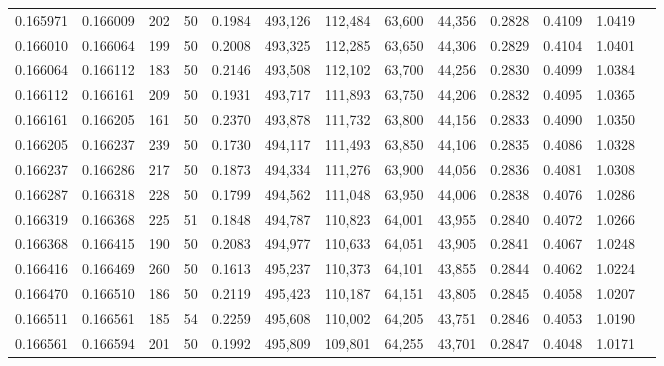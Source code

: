\begin{tabular}{rrrrrrrrrrrrr}
0.165971 & 0.166009 &   202 &  50 &                                     0.1984 & 493,126 & 112,484 &  63,600 &  44,356 & 0.2828 & 0.4109 & 1.0419 \\
0.166010 & 0.166064 &   199 &  50 &                                     0.2008 & 493,325 & 112,285 &  63,650 &  44,306 & 0.2829 & 0.4104 & 1.0401 \\
0.166064 & 0.166112 &   183 &  50 &                                     0.2146 & 493,508 & 112,102 &  63,700 &  44,256 & 0.2830 & 0.4099 & 1.0384 \\
0.166112 & 0.166161 &   209 &  50 &                                     0.1931 & 493,717 & 111,893 &  63,750 &  44,206 & 0.2832 & 0.4095 & 1.0365 \\
0.166161 & 0.166205 &   161 &  50 &                                     0.2370 & 493,878 & 111,732 &  63,800 &  44,156 & 0.2833 & 0.4090 & 1.0350 \\
0.166205 & 0.166237 &   239 &  50 &                                     0.1730 & 494,117 & 111,493 &  63,850 &  44,106 & 0.2835 & 0.4086 & 1.0328 \\
0.166237 & 0.166286 &   217 &  50 &                                     0.1873 & 494,334 & 111,276 &  63,900 &  44,056 & 0.2836 & 0.4081 & 1.0308 \\
0.166287 & 0.166318 &   228 &  50 &                                     0.1799 & 494,562 & 111,048 &  63,950 &  44,006 & 0.2838 & 0.4076 & 1.0286 \\
0.166319 & 0.166368 &   225 &  51 &                                     0.1848 & 494,787 & 110,823 &  64,001 &  43,955 & 0.2840 & 0.4072 & 1.0266 \\
0.166368 & 0.166415 &   190 &  50 &                                     0.2083 & 494,977 & 110,633 &  64,051 &  43,905 & 0.2841 & 0.4067 & 1.0248 \\
0.166416 & 0.166469 &   260 &  50 &                                     0.1613 & 495,237 & 110,373 &  64,101 &  43,855 & 0.2844 & 0.4062 & 1.0224 \\
0.166470 & 0.166510 &   186 &  50 &                                     0.2119 & 495,423 & 110,187 &  64,151 &  43,805 & 0.2845 & 0.4058 & 1.0207 \\
0.166511 & 0.166561 &   185 &  54 &                                     0.2259 & 495,608 & 110,002 &  64,205 &  43,751 & 0.2846 & 0.4053 & 1.0190 \\
0.166561 & 0.166594 &   201 &  50 &                                     0.1992 & 495,809 & 109,801 &  64,255 &  43,701 & 0.2847 & 0.4048 & 1.0171 \\

\end{tabular}

